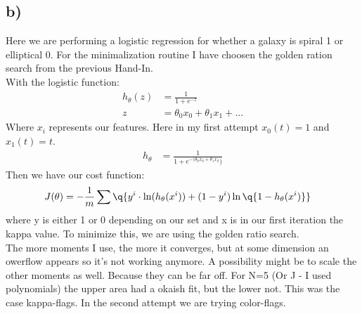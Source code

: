 \subsection{b)}
Here we are performing a logistic regression for whether a galaxy is spiral 1 or elliptical 0. For the minimalization routine I have choosen the golden ration search from the previous Hand-In. \\
With the logistic function: 
\begin{align}
    h_\theta(z) &= \frac{1}{1+e^{-z}}\\
    z &= \theta_0 x_0 + \theta_1 x_1 + ... 
\end{align}
Where $x_i$ represents our features. Here in my first attempt  $x_0(t) = 1$ and $x_{1}(t) = t$. 
\begin{align}
    h_\theta &= \frac{1}{1+e^{-(\theta_0 x_0+ \theta_1 x_2})}
\end{align}
Then we have our cost function: 
\begin{align}
    J(\theta) &= - \frac{1}{m} \sum \q{y^{i}  \cdot \ln(h_\theta (x^{i})) + (1-y^{i})\ln\q{1-h_\theta(x^{i})}}
\end{align}
where y is either 1 or 0 depending on our set and x is in our first iteration the kappa value. To minimize this, we are using the golden ratio search. \\

The more moments I use, the more it converges, but at some dimension an owerflow appears so it's not working anymore. A possibility might be to scale the other moments as well. Because they can be far off. For N=5 (Or J - I used polynomials) the upper area had a okaish fit, but the lower not. This was the case kappa-flags. 
In the second attempt we are trying color-flags.


